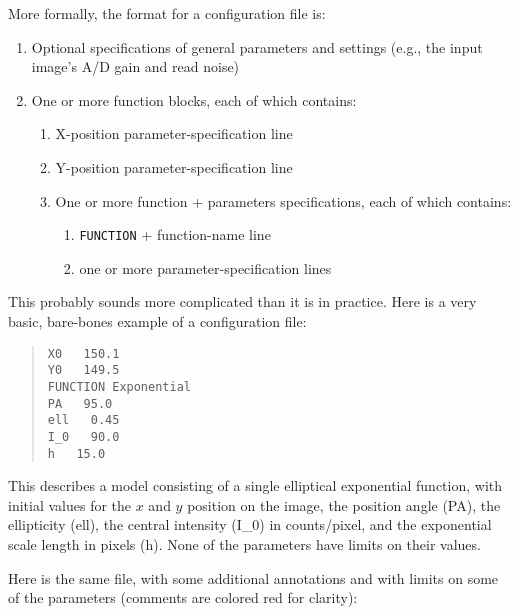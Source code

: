 \documentclass[10pt]{article}
\begin{document}
More formally, the format for a configuration file is:
\begin{enumerate}
\item Optional specifications of general parameters and settings (e.g., the
input image's A/D gain and read noise)
\item One or more function blocks, each of which contains:
\begin{enumerate}
\item X-position parameter-specification line
\item Y-position parameter-specification line
\item One or more function + parameters specifications, each of which contains:
\begin{enumerate}
\item \texttt{FUNCTION} + function-name line
\item one or more parameter-specification lines
\end{enumerate}
\end{enumerate}
\end{enumerate}

This probably sounds more complicated than it is in practice.
Here is a very basic, bare-bones example of a configuration file:

\begin{quote}
  \texttt{X0  ~  150.1}\\
  \texttt{Y0  ~  149.5}\\
  \texttt{FUNCTION   Exponential}\\
  \texttt{PA  ~  95.0}\\
  \texttt{ell  ~  0.45}\\
  \texttt{I\_0 ~  90.0}\\
  \texttt{h   ~  15.0}\\
\end{quote}

This describes a model consisting of a single elliptical exponential
function, with initial values for the $x$ and $y$ position on the image,
the position angle (PA), the ellipticity (ell), the central intensity
(I\_0) in counts/pixel, and the exponential scale length in pixels (h).
None of the parameters have limits on their values.

Here is the same file, with some additional annotations and with limits on
some of the parameters (comments are colored red for clarity):
\end{document}
